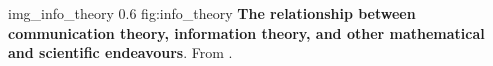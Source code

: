 \begin{myfig}
    {img_info_theory} %
    {0.6} %
    {fig:info_theory} %
    {\textbf{The relationship between communication theory, information theory, and other mathematical and scientific endeavours}.
    From \citet[p. 2, fig. 1.1]{cover2006elements}.
    } %
\end{myfig}